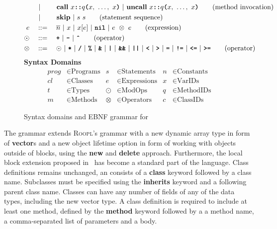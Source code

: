 \begin{figure}[h]
\begin{align}
    			&\ |\ \qquad \textbf{call}\ x\textbf{\texttt{::}}q\textbf{\texttt{(}}x,\ \dots,\ x\textbf{\texttt{)}}\ |\ \textbf{uncall}\ x\textbf{\texttt{::}}q\textbf{\texttt{(}}x,\ \dots,\ x\textbf{\texttt{)}}\tag{method invocation}\\
    			&\ |\ \qquad \textbf{skip}\ |\ s\ s\tag{statement sequence}\\
    e			\quad&::=\quad \overline{n}\ |\ x\ |\ x[e]\ |\ \textbf{\texttt{nil}}\ |\ e\ \otimes\ e\tag{expression}\\
    \odot	\quad&::=\quad \textbf{\texttt{+}}\ |\ \textbf{\texttt{-}}\ |\ \textbf{\texttt{\^}}\tag{operator}\\
    \otimes\quad&::=\quad \odot\ |\ \textbf{\texttt{*}}\ |\ \textbf{\texttt{/}}\ |\ \textbf{\texttt{\%}}\ |\ \textbf{\texttt{\&}}\ |\ \textbf{\texttt{|}}\ |\ \textbf{\texttt{\&\&}}\ |\ \textbf{\texttt{||}}\ |\ \textbf{\texttt{<}}\ |\ \textbf{\texttt{\textgreater}}\ |\ \textbf{\texttt{=}}\ |\ \textbf{\texttt{!=}}\ |\ \textbf{\texttt{<=}}\ |\ \textbf{\texttt{\textgreater=}}\tag{operator}
    \end{align}
    \vspace{2mm}
    \textbf{Syntax Domains}
    \begin{align*}
    prog &\in \text{Programs} & s &\in \text{Statements}      & n &\in \text{Constants} \\
    cl   &\in \text{Classes}  & e &\in \text{Expressions}     & x &\in \text{VarIDs}    \\
    t    &\in \text{Types}    & \odot &\in \text{ModOps}      & q &\in \text{MethodIDs} \\
    m    &\in \text{Methods}  & \otimes &\in \text{Operators} & c &\in \text{ClassIDs}
    \end{align*}
    \caption{Syntax domains and EBNF grammar for \rooplpp}
    \label{fig:roopl-grammar}
\end{figure}

The \rooplpp grammar extends \textsc{Roopl}'s grammar with a new dynamic array type in form of \textbf{vector}s and a new object lifetime option in form of working with objects outside of blocks, using the \textbf{new} and \textbf{delete} approach. Furthermore, the local block extension proposed in~\cite{th:roopl} has become a standard part of the language. Class definitions remains unchanged, an consists of a \textbf{class} keyword followed by a class name. Subclasses must be specified using the \textbf{inherits} keyword and a following parent class name. Classes can have any number of fields of any of the data types, including the new vector type. A class definition is required to include at least one method, defined by the \textbf{method} keyword followed by a a method name, a comma-separated list of parameters and a body.

